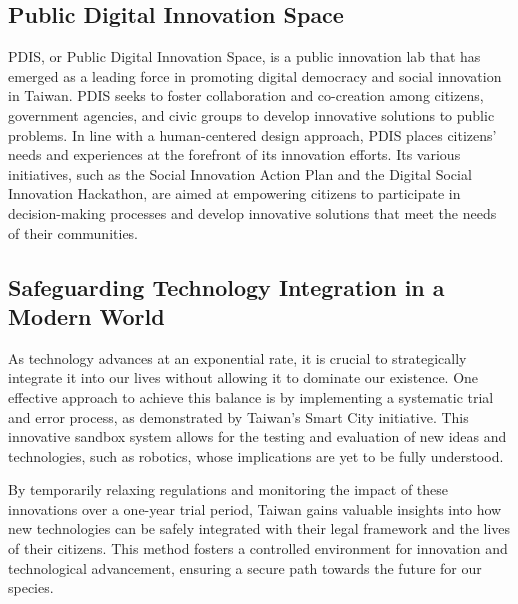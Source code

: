 \documentclass{IEEEtran}
\begin{document}
\subsection{Public Digital Innovation Space}
PDIS, or Public Digital Innovation Space, is a public innovation lab that has emerged as a leading force in promoting digital democracy and social innovation in Taiwan. PDIS seeks to foster collaboration and co-creation among citizens, government agencies, and civic groups to develop innovative solutions to public problems.
In line with a human-centered design approach, PDIS places citizens' needs and experiences at the forefront of its innovation efforts. Its various initiatives, such as the Social Innovation Action Plan and the Digital Social Innovation Hackathon, are aimed at empowering citizens to participate in decision-making processes and develop innovative solutions that meet the needs of their communities.



\subsection{Safeguarding Technology Integration in a Modern World}

As technology advances at an exponential rate, it is crucial to strategically integrate it into our lives without allowing it to dominate our existence. One effective approach to achieve this balance is by implementing a systematic trial and error process, as demonstrated by Taiwan's Smart City initiative. This innovative sandbox system allows for the testing and evaluation of new ideas and technologies, such as robotics, whose implications are yet to be fully understood.

By temporarily relaxing regulations and monitoring the impact of these innovations over a one-year trial period, Taiwan gains valuable insights into how new technologies can be safely integrated with their legal framework and the lives of their citizens. This method fosters a controlled environment for innovation and technological advancement, ensuring a secure path towards the future for our species.
\end{document}
